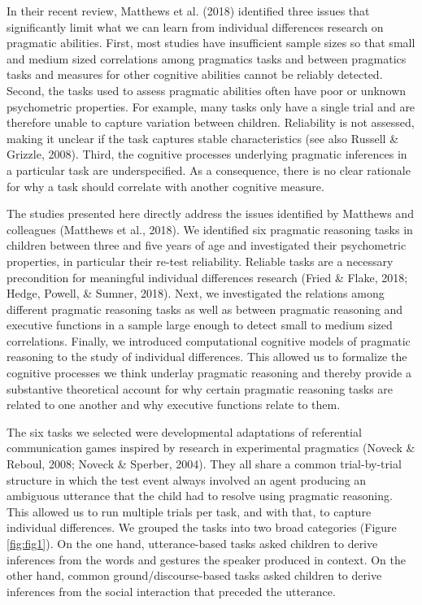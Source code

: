\documentclass[
  man,floatsintext]{apa6}
\begin{document}
In their recent review, Matthews et al. (2018) identified three issues that significantly limit what we can learn from individual differences research on pragmatic abilities. First, most studies have insufficient sample sizes so that small and medium sized correlations among pragmatics tasks and between pragmatics tasks and measures for other cognitive abilities cannot be reliably detected. Second, the tasks used to assess pragmatic abilities often have poor or unknown psychometric properties. For example, many tasks only have a single trial and are therefore unable to capture variation between children. Reliability is not assessed, making it unclear if the task captures stable characteristics (see also Russell \& Grizzle, 2008). Third, the cognitive processes underlying pragmatic inferences in a particular task are underspecified. As a consequence, there is no clear rationale for why a task should correlate with another cognitive measure.

The studies presented here directly address the issues identified by Matthews and colleagues (Matthews et al., 2018). We identified six pragmatic reasoning tasks in children between three and five years of age and investigated their psychometric properties, in particular their re-test reliability. Reliable tasks are a necessary precondition for meaningful individual differences research (Fried \& Flake, 2018; Hedge, Powell, \& Sumner, 2018). Next, we investigated the relations among different pragmatic reasoning tasks as well as between pragmatic reasoning and executive functions in a sample large enough to detect small to medium sized correlations. Finally, we introduced computational cognitive models of pragmatic reasoning to the study of individual differences. This allowed us to formalize the cognitive processes we think underlay pragmatic reasoning and thereby provide a substantive theoretical account for why certain pragmatic reasoning tasks are related to one another and why executive functions relate to them.

The six tasks we selected were developmental adaptations of referential communication games inspired by research in experimental pragmatics (Noveck \& Reboul, 2008; Noveck \& Sperber, 2004). They all share a common trial-by-trial structure in which the test event always involved an agent producing an ambiguous utterance that the child had to resolve using pragmatic reasoning. This allowed us to run multiple trials per task, and with that, to capture individual differences. We grouped the tasks into two broad categories (Figure \ref{fig:fig1}). On the one hand, utterance-based tasks asked children to derive inferences from the words and gestures the speaker produced in context. On the other hand, common ground/discourse-based tasks asked children to derive inferences from the social interaction that preceded the utterance.
\end{document}
